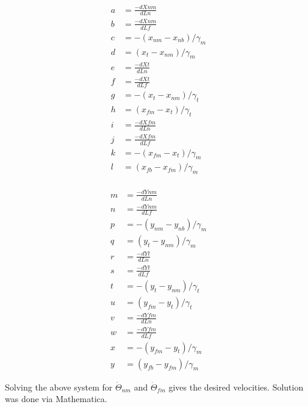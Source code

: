 \documentclass[10pt]{article} %
\begin{document}
\begin{center}
  \begin{minipage}{0.3\textwidth}
    \begin{align*}
      a &= \frac{-dXnm}{dLn}\\
       b &= \frac{-dXnm}{dLf}\\
       c &= -(x_{nm} - x_{nb}) / \gamma_m\\
       d &= (x_t - x_{nm}) / \gamma_m\\
       e &= \frac{-dXt}{dLn}\\
       f &= \frac{-dXt}{dLf}\\
       g &= -(x_t - x_{nm}) / \gamma_t\\
       h &= (x_{fm} - x_t) / \gamma_t\\
       i &= \frac{-dXfm}{dLn}\\
       j &= \frac{-dXfm}{dLf}\\
       k &= -(x_{fm} - x_t) / \gamma_m\\
       l &= (x_{fb} - x_{fm}) / \gamma_m\\
    \end{align*}
  \end{minipage}
  \begin{minipage}{0.3\textwidth}
    \begin{align*}
       m &= \frac{-dYnm}{dLn}\\
       n &= \frac{-dYnm}{dLf}\\
       p &= -(y_{nm} - y_{nb}) / \gamma_m\\
       q &= (y_t - y_{nm}) / \gamma_m\\
       r &= \frac{-dYt}{dLn}\\
       s &= \frac{-dYt}{dLf}\\
       t &= -(y_t - y_{nm}) / \gamma_t\\
       u &= (y_{fm} - y_t) / \gamma_t\\
       v &= \frac{-dYfm}{dLn}\\
       w &= \frac{-dYfm}{dLf}\\
       x &= -(y_{fm} - y_t) / \gamma_m\\
       y &= (y_{fb} - y_{fm}) / \gamma_m
    \end{align*}
  \end{minipage}
\end{center}

Solving the above system for $\dot{\Theta}_{nm}$ and $\dot{\Theta}_{fm}$ gives the desired velocities. Solution was done via Mathematica.
\end{document}
